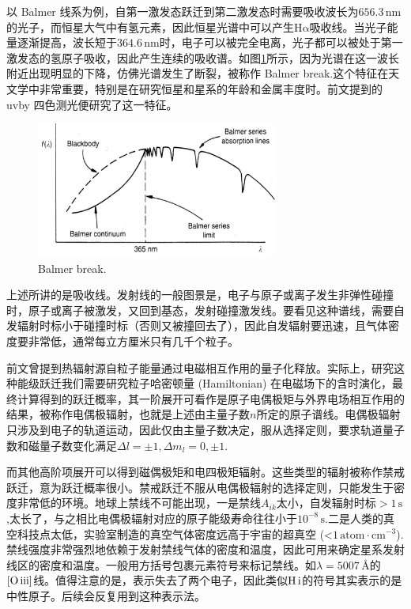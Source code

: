 \documentclass[../天体物理基础.tex]{subfiles}
\begin{document}
以 Balmer 线系为例，自第一激发态跃迁到第二激发态时需要吸收波长为$656.3\,\mathrm{nm}$的光子，而恒星大气中有氢元素，因此恒星光谱中可以产生$\mathrm{H\alpha}$吸收线。当光子能量逐渐提高，波长短于$364.6\,\mathrm{nm}$时，电子可以被完全电离，光子都可以被处于第一激发态的氢原子吸收，因此产生连续的吸收谱。如图\ref{Balmer break.}所示，因为光谱在这一波长附近出现明显的下降，仿佛光谱发生了断裂，被称作 Balmer break.这个特征在天文学中非常重要，特别是在研究恒星和星系的年龄和金属丰度时。前文提到的 uvby 四色测光便研究了这一特征。
\begin{figure}[!htbp]
\centering
\includegraphics[width=8cm]{figures/figure1_12.png}
\captionsetup{justification=raggedright, singlelinecheck=false}
\caption{Balmer break.}
\label{Balmer break.}
\end{figure}

上述所讲的是吸收线。发射线的一般图景是，电子与原子或离子发生非弹性碰撞时，原子或离子被激发，又回到基态，发射碰撞激发线。要看见这种谱线，需要自发辐射时标小于碰撞时标（否则又被撞回去了），因此自发辐射要迅速，且气体密度要非常低，通常每立方厘米只有几千个粒子。

前文曾提到热辐射源自粒子能量通过电磁相互作用的量子化释放。实际上，研究这种能级跃迁我们需要研究粒子哈密顿量 (Hamiltonian) 在电磁场下的含时演化，最终计算得到的跃迁概率，其一阶展开可看作是原子电偶极矩与外界电场相互作用的结果，被称作电偶极辐射，也就是上述由主量子数$n$所定的原子谱线。电偶极辐射只涉及到电子的轨道运动，因此仅由主量子数决定，服从选择定则，要求轨道量子数和磁量子数变化满足$\Delta{}l=\pm1,\Delta{}m_{l}=0,\pm1$.

而其他高阶项展开可以得到磁偶极矩和电四极矩辐射。这些类型的辐射被称作禁戒跃迁，意为跃迁概率很小。禁戒跃迁不服从电偶极辐射的选择定则，只能发生于密度非常低的环境。地球上禁线不可能出现，一是禁线$A_{ik}$太小，自发辐射时标$>1\,\mathrm{s}$,太长了，与之相比电偶极辐射对应的原子能级寿命往往小于$10^{-8}\,\mathrm{s}$.二是人类的真空科技点太低，实验室制造的真空气体密度远高于宇宙的超真空 (<$1\,\mathrm{atom\cdot cm^{-3}}$).禁线强度非常强烈地依赖于发射禁线气体的密度和温度，因此可用来确定星系发射线区的密度和温度。一般用方括号包裹元素符号来标记禁线。如$\lambda=5007\,\si{\angstrom}$的$\mathrm{[O\,\uppercase\expandafter{\romannumeral3}]}$线。值得注意的是，\uppercase\expandafter{}表示失去了两个电子，因此类似$\mathrm{H\,\uppercase\expandafter{\romannumeral1}}$的符号其实表示的是中性原子。后续会反复用到这种表示法。
\end{document}
